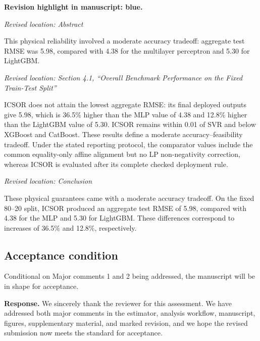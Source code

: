 \documentclass[11pt,a4paper]{article}
\newcommand{\revisionnotice}{\par\noindent\textcolor{revisionblue}{\textbf{Revision highlight in manuscript: blue.}}\par}
\newcommand{\excerptlocation}[1]{\par\noindent\textit{Revised location: #1}\par}
\begin{document}
\revisionnotice

\excerptlocation{Abstract}
\begin{revisionexcerpt}
This physical reliability involved a moderate accuracy tradeoff: aggregate test RMSE was 5.98, compared with 4.38 for the multilayer perceptron and 5.30 for LightGBM.
\end{revisionexcerpt}

\excerptlocation{Section 4.1, ``Overall Benchmark Performance on the Fixed Train-Test Split''}
\begin{revisionexcerpt}
ICSOR does not attain the lowest aggregate RMSE: its final deployed outputs give 5.98, which is 36.5\% higher than the MLP value of 4.38 and 12.8\% higher than the LightGBM value of 5.30. ICSOR remains within 0.01 of SVR and below XGBoost and CatBoost. These results define a moderate accuracy--feasibility tradeoff. Under the stated reporting protocol, the comparator values include the common equality-only affine alignment but no LP non-negativity correction, whereas ICSOR is evaluated after its complete checked deployment rule.
\end{revisionexcerpt}

\excerptlocation{Conclusion}
\begin{revisionexcerpt}
These physical guarantees came with a moderate accuracy tradeoff. On the fixed 80--20 split, ICSOR produced an aggregate test RMSE of 5.98, compared with 4.38 for the MLP and 5.30 for LightGBM. These differences correspond to increases of 36.5\% and 12.8\%, respectively.
\end{revisionexcerpt}

\subsection*{Acceptance condition}

\begin{reviewercomment}
Conditional on Major comments 1 and 2 being addressed, the manuscript will be in shape for acceptance.
\end{reviewercomment}

\noindent\textbf{Response.} We sincerely thank the reviewer for this assessment. We have addressed both major comments in the estimator, analysis workflow, manuscript, figures, supplementary material, and marked revision, and we hope the revised submission now meets the standard for acceptance.
\end{document}
